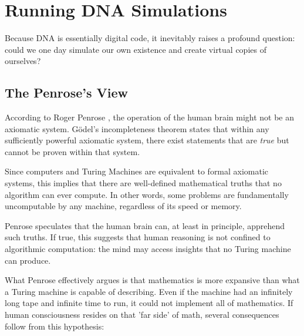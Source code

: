 \chapter{Running DNA Simulations}
\label{chap:running-dna-simulations}

Because DNA is essentially digital code, it inevitably raises a profound question: could we one day simulate our own existence and create virtual copies of ourselves?

\section{The Penrose's View}

According to Roger Penrose \cite{penrose1989emperor}, the operation of the human brain might not be an axiomatic system.
G\"odel's incompleteness theorem states that within any sufficiently powerful axiomatic system, there exist statements that are \emph{true} but cannot be proven within that system. 

Since computers and Turing Machines are equivalent to formal axiomatic systems, this implies that there are well-defined mathematical truths that no algorithm can ever compute.
In other words, some problems are fundamentally uncomputable by any machine, regardless of its speed or memory.

Penrose speculates that the human brain can, at least in principle, apprehend such truths.
If true, this suggests that human reasoning is not confined to algorithmic computation: the mind may access insights that no Turing machine can produce.  

What Penrose effectively argues is that mathematics is more expansive than what a Turing machine is capable of describing.
Even if the machine had an infinitely long tape and infinite time to run, it could not implement all of mathematics. If human consciousness resides on that 'far side' of math, several consequences follow from this hypothesis:

